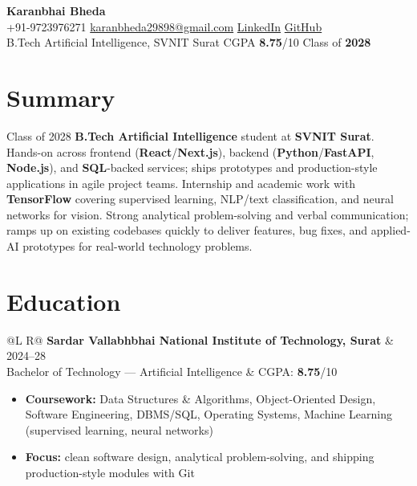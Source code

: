 \documentclass[a4paper,10pt]{article}
\makeatletter
\newcommand{\entry}[4]{%
  \vspace{0.5mm}
  \noindent\begin{tabularx}{\textwidth}{@{}L R@{}}
    \textbf{#1} & {\small #2} \\
    {\small #3} & {\small #4} \\
  \end{tabularx}\par
}
\makeatother
\begin{document}
\selectfont

\begin{center}
  {\LARGE \textbf{Karanbhai Bheda}} \\[1.1mm]
  \small
  +91-9723976271 \textbar{}
  \href{mailto:karanbheda29898@gmail.com}{karanbheda29898@gmail.com} \textbar{}
  \href{https://www.linkedin.com/in/karan-bheda-2a7483335/}{LinkedIn} \textbar{}
  \href{https://github.com/KARANBHAI029}{GitHub} \\[0.35mm]
  B.Tech Artificial Intelligence, SVNIT Surat \textbar{} CGPA \textbf{8.75}/10 \textbar{} Class of \textbf{2028}
\end{center}

\section{Summary}
\noindent\small
Class of 2028 \textbf{B.Tech Artificial Intelligence} student at \textbf{SVNIT Surat}. Hands-on across frontend (\textbf{React}/\textbf{Next.js}), backend (\textbf{Python}/\textbf{FastAPI}, \textbf{Node.js}), and \textbf{SQL}-backed services; ships prototypes and production-style applications in agile project teams.
Internship and academic work with \textbf{TensorFlow} covering supervised learning, NLP/text classification, and neural networks for vision.
Strong analytical problem-solving and verbal communication; ramps up on existing codebases quickly to deliver features, bug fixes, and applied-AI prototypes for real-world technology problems.

\section{Education}
\entry{Sardar Vallabhbhai National Institute of Technology, Surat}{2024--28}
{Bachelor of Technology --- Artificial Intelligence}{CGPA: \textbf{8.75}/10}
\begin{itemize}
  \item \textbf{Coursework:} Data Structures \& Algorithms, Object-Oriented Design, Software Engineering, DBMS/SQL, Operating Systems, Machine Learning (supervised learning, neural networks)
  \item \textbf{Focus:} clean software design, analytical problem-solving, and shipping production-style modules with Git
\end{itemize}
\end{document}
